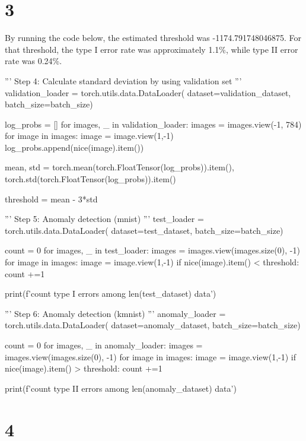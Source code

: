 \documentclass[10pt]{article}
\begin{document}
\section*{3}
By running the code below, the estimated threshold was -1174.791748046875. For that threshold, the type I error rate was approximately 1.1\%, while type II error rate was 0.24\%.
\begin{python}
'''
Step 4: Calculate standard deviation by using validation set
'''
validation_loader = torch.utils.data.DataLoader(
    dataset=validation_dataset, batch_size=batch_size)


log_probs = []
for images, _ in validation_loader:
  images = images.view(-1, 784)
  for image in images:
    image = image.view(1,-1)
    log_probs.append(nice(image).item())


mean, std = torch.mean(torch.FloatTensor(log_probs)).item(), torch.std(torch.FloatTensor(log_probs)).item()

threshold = mean - 3*std

'''
Step 5: Anomaly detection (mnist)
'''
test_loader = torch.utils.data.DataLoader(
    dataset=test_dataset, batch_size=batch_size)

count = 0
for images, _ in test_loader:
  images = images.view(images.size(0), -1)
  for image in images:
    image = image.view(1,-1)
    if nice(image).item() < threshold:
      count +=1

print(f'{count} type I errors among {len(test_dataset)} data')

'''
Step 6: Anomaly detection (kmnist)
'''
anomaly_loader = torch.utils.data.DataLoader(
    dataset=anomaly_dataset, batch_size=batch_size)

count = 0
for images, _ in anomaly_loader:
  images = images.view(images.size(0), -1)
  for image in images:
    image = image.view(1,-1)
    if nice(image).item() > threshold:
      count +=1

print(f'{count} type II errors among {len(anomaly_dataset)} data')
\end{python}
\section*{4}
\end{document}

